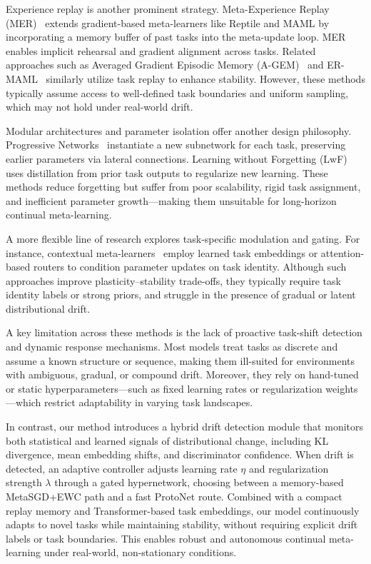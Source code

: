 \documentclass[conference]{IEEEtran}
\begin{document}
Experience replay is another prominent strategy. Meta-Experience Replay (MER)~\cite{riemer2019learning} extends gradient-based meta-learners like Reptile and MAML by incorporating a memory buffer of past tasks into the meta-update loop. MER enables implicit rehearsal and gradient alignment across tasks. Related approaches such as Averaged Gradient Episodic Memory (A-GEM)~\cite{chaudhry2018efficient} and ER-MAML~\cite{pham2021contextual} similarly utilize task replay to enhance stability. However, these methods typically assume access to well-defined task boundaries and uniform sampling, which may not hold under real-world drift.

Modular architectures and parameter isolation offer another design philosophy. Progressive Networks~\cite{rusu2016progressive} instantiate a new subnetwork for each task, preserving earlier parameters via lateral connections. Learning without Forgetting (LwF)~\cite{li2017learning} uses distillation from prior task outputs to regularize new learning. These methods reduce forgetting but suffer from poor scalability, rigid task assignment, and inefficient parameter growth—making them unsuitable for long-horizon continual meta-learning.

A more flexible line of research explores task-specific modulation and gating. For instance, contextual meta-learners~\cite{von2019continual, yoon2020xtarnet} employ learned task embeddings or attention-based routers to condition parameter updates on task identity. Although such approaches improve plasticity–stability trade-offs, they typically require task identity labels or strong priors, and struggle in the presence of gradual or latent distributional drift.

A key limitation across these methods is the lack of proactive task-shift detection and dynamic response mechanisms. Most models treat tasks as discrete and assume a known structure or sequence, making them ill-suited for environments with ambiguous, gradual, or compound drift. Moreover, they rely on hand-tuned or static hyperparameters—such as fixed learning rates or regularization weights—which restrict adaptability in varying task landscapes.

In contrast, our method introduces a hybrid drift detection module that monitors both statistical and learned signals of distributional change, including KL divergence, mean embedding shifts, and discriminator confidence. When drift is detected, an adaptive controller adjusts learning rate $\eta$ and regularization strength $\lambda$ through a gated hypernetwork, choosing between a memory-based MetaSGD+EWC path and a fast ProtoNet route. Combined with a compact replay memory and Transformer-based task embeddings, our model continuously adapts to novel tasks while maintaining stability, without requiring explicit drift labels or task boundaries. This enables robust and autonomous continual meta-learning under real-world, non-stationary conditions.
\end{document}
